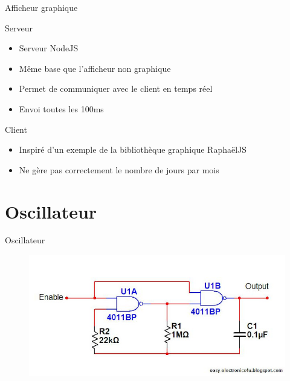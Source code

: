 \documentclass[handout]{beamer}
\begin{document}
\begin{frame}{Afficheur graphique}
	\begin{block}{Serveur}
		\begin{itemize}
			\item Serveur NodeJS
			\item Même base que l'afficheur non graphique
			\item Permet de communiquer avec le client en temps réel
			\item Envoi toutes les 100ms
		\end{itemize}
	\end{block}
	
	\pause
	
	\begin{block}{Client}
		\begin{itemize}
			\item Inspiré d'un exemple de la bibliothèque graphique RaphaëlJS
			\item Ne gère pas correctement le nombre de jours par mois
		\end{itemize}
	\end{block}
\end{frame}



\section{Oscillateur}
\begin{frame}{Oscillateur}
	\begin{figure}
		\centering
		\includegraphics[width=\textwidth,height=0.9\textheight,keepaspectratio]{oscillator.jpg}
	\end{figure}
\end{frame}
\end{document}

